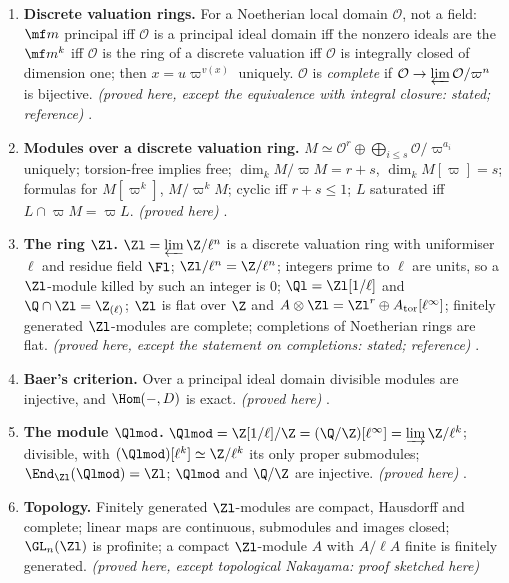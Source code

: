 \begin{enumerate}[label=\textbf{\thechapter.\arabic*}]
primitive, the quotient is cyclic $\simeq R/(r)$, $rh=f+g_0$ with $p_1(h)=f/r$, $g_0\in L_2$, and $f\equiv g\pmod{r'M}$ for some $g\in L_2$ iff $r'\mid r$. \emph{(proved here)}
.
\item \textbf{Discrete valuation rings.} For a Noetherian local domain $\mathcal O$, not a field: $\mf m$ principal iff $\mathcal O$ is a principal ideal domain iff the nonzero ideals
are the $\mf m^k$ iff $\mathcal O$ is the ring of a discrete valuation iff $\mathcal O$ is integrally closed of dimension one; then $x=u\varpi^{v(x)}$ uniquely.
$\mathcal O$ is \emph{complete} if $\mathcal O\to\varprojlim\mathcal O/\varpi^n$ is bijective. \emph{(proved here,
except the equivalence with integral closure: stated; reference)} .
\item \textbf{Modules over a discrete valuation ring.} $M\simeq\mathcal O^r\oplus\bigoplus_{i\le s}\mathcal O/\varpi^{a_i}$ uniquely; torsion-free implies free; $\dim_kM/\varpi M=r+s$, $\dim_kM[\varpi]=s$;
formulas for $M[\varpi^k]$, $M/\varpi^kM$; cyclic iff $r+s\le1$; $L$ saturated iff $L\cap\varpi M=\varpi L$. \emph{(proved here)} .
\item \textbf{The ring $\Zl$.} $\Zl=\varprojlim\Z/\ell^n$ is a discrete valuation ring with uniformiser $\ell$ and residue field $\Fl$; $\Zl/\ell^n=\Z/\ell^n$; integers prime to $\ell$ are units,
so a $\Zl$-module killed by such an integer is $0$; $\Ql=\Zl[1/\ell]$ and $\Q\cap\Zl=\Z_{(\ell)}$; $\Zl$ is flat over $\Z$ and $A\otimes\Zl=\Zl^r\oplus A_{\mathrm{tor}}[\ell^\infty]$; finitely generated $\Zl$-modules
are complete; completions of Noetherian rings are flat. \emph{(proved here, except the statement on completions: stated; reference)} .
\item \textbf{Baer's criterion.} Over a principal ideal domain divisible modules are injective, and $\Hom(-,D)$ is exact. \emph{(proved here)} .
\item \textbf{The module $\Qlmod$.} $\Qlmod=\Z[1/\ell]/\Z=(\Q/\Z)[\ell^\infty]=\varinjlim\Z/\ell^k$; divisible, with $(\Qlmod)[\ell^k]\simeq\Z/\ell^k$ its only proper submodules;
$\End_{\Zl}(\Qlmod)=\Zl$; $\Qlmod$ and $\Q/\Z$ are injective. \emph{(proved here)} .
\item \textbf{Topology.} Finitely generated $\Zl$-modules are compact, Hausdorff and complete; linear maps are continuous, submodules and images closed; $\GL_n(\Zl)$ is
profinite; a compact $\Zl$-module $A$ with $A/\ell A$ finite is finitely generated. \emph{(proved here, except topological Nakayama: proof sketched here)}

\end{enumerate}
